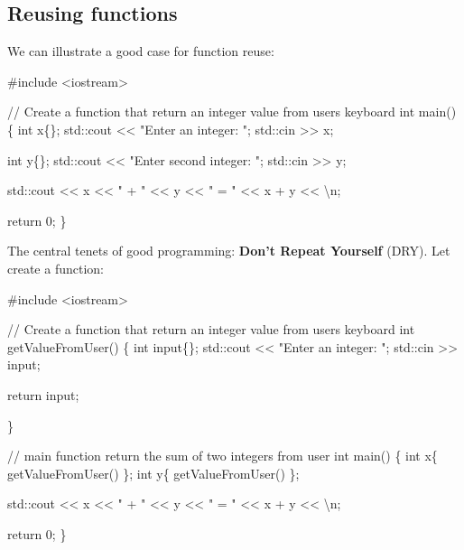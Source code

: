 \documentclass[
  letterpaper,
  DIV=11,
  numbers=noendperiod]{scrreprt}
\newenvironment{Shaded}{\begin{snugshade}}{\end{snugshade}}
\newcommand{\CommentTok}[1]{\textcolor[rgb]{0.37,0.37,0.37}{#1}}
\newcommand{\ControlFlowTok}[1]{\textcolor[rgb]{0.00,0.23,0.31}{#1}}
\newcommand{\ErrorTok}[1]{\textcolor[rgb]{0.68,0.00,0.00}{#1}}
\newcommand{\NormalTok}[1]{\textcolor[rgb]{0.00,0.23,0.31}{#1}}
\newcommand{\SpecialCharTok}[1]{\textcolor[rgb]{0.37,0.37,0.37}{#1}}
\newcommand{\StringTok}[1]{\textcolor[rgb]{0.13,0.47,0.30}{#1}}
\begin{document}
\hypertarget{reusing-functions}{%
\subsection{Reusing functions}\label{reusing-functions}}

We can illustrate a good case for function reuse:

\begin{Shaded}
\begin{Highlighting}[]
\CommentTok{\#include \textless{}iostream\textgreater{}}

\SpecialCharTok{/}\ErrorTok{/}\NormalTok{ Create a }\ControlFlowTok{function}\NormalTok{ that return an integer value from user}\StringTok{\textquotesingle{}s keyboard}
\StringTok{int main()}
\StringTok{\{}
\StringTok{    int x\{\};}
\StringTok{    std::cout \textless{}\textless{} "Enter an integer: ";}
\StringTok{    std::cin \textgreater{}\textgreater{} x;}

\StringTok{    int y\{\};}
\StringTok{    std::cout \textless{}\textless{} "Enter second integer: ";}
\StringTok{    std::cin \textgreater{}\textgreater{} y;}

\StringTok{    std::cout \textless{}\textless{} x \textless{}\textless{} " + " \textless{}\textless{} y \textless{}\textless{} " = " \textless{}\textless{} x + y \textless{}\textless{} \textquotesingle{}}\NormalTok{\textbackslash{}n}\StringTok{\textquotesingle{};}

\StringTok{    return 0;}
\StringTok{\}}
\end{Highlighting}
\end{Shaded}

The central tenets of good programming: \textbf{Don't Repeat Yourself}
(DRY). Let create a function:

\begin{Shaded}
\begin{Highlighting}[]
\CommentTok{\#include \textless{}iostream\textgreater{}}

\SpecialCharTok{/}\ErrorTok{/}\NormalTok{ Create a }\ControlFlowTok{function}\NormalTok{ that return an integer value from user}\StringTok{\textquotesingle{}s keyboard}
\StringTok{int getValueFromUser()}
\StringTok{\{}
\StringTok{    int input\{\};}
\StringTok{    std::cout \textless{}\textless{} "Enter an integer: ";}
\StringTok{    std::cin \textgreater{}\textgreater{} input;}

\StringTok{    return input;}

\StringTok{\}}

\StringTok{// main function return the sum of two integers from user}
\StringTok{int main()}
\StringTok{\{}
\StringTok{    int x\{ getValueFromUser() \};}
\StringTok{    int y\{ getValueFromUser() \};}

\StringTok{    std::cout \textless{}\textless{} x \textless{}\textless{} " + " \textless{}\textless{} y \textless{}\textless{} " = " \textless{}\textless{} x + y \textless{}\textless{} \textquotesingle{}}\NormalTok{\textbackslash{}n}\StringTok{\textquotesingle{};}

\StringTok{    return 0;}
\StringTok{\}}
\end{Highlighting}
\end{Shaded}
\end{document}
